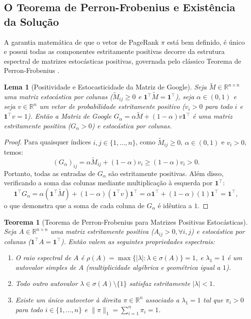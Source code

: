 \documentclass[10pt,a4paper]{article}
\theoremstyle{definition}
\theoremstyle{plain}
\newtheorem{teorema}[definicao]{Teorema}
\newtheorem{lema}[definicao]{Lema}
\theoremstyle{remark}
\begin{document}
\subsection{\sffamily O Teorema de Perron-Frobenius e Existência da Solução}

A garantia matemática de que o vetor de PageRank $\pi$ está bem definido, é único e possui todas as componentes estritamente positivas decorre da estrutura espectral de matrizes estocásticas positivas, governada pelo clássico Teorema de Perron-Frobenius \cite{strang2016, langville2006}.

\begin{lema}[Positividade e Estocasticidade da Matriz de Google]
\label{lema:positividade_google}
Seja $\widetilde{M} \in \mathbb{R}^{n \times n}$ uma matriz estocástica por colunas ($\widetilde{M}_{ij} \ge 0$ e $\mathbf{1}^{\top}\widetilde{M} = \mathbf{1}^{\top}$), seja $\alpha \in (0, 1)$ e seja $v \in \mathbb{R}^n$ um vetor de probabilidade estritamente positivo ($v_i > 0$ para todo $i$ e $\mathbf{1}^{\top}v = 1$). Então a Matriz de Google $G_{\alpha} = \alpha \widetilde{M} + (1 - \alpha) v \mathbf{1}^{\top}$ é uma matriz estritamente positiva ($G_{\alpha} > 0$) e estocástica por colunas.
\end{lema}

\begin{proof}
Para quaisquer índices $i, j \in \{1, \dots, n\}$, como $\widetilde{M}_{ij} \ge 0$, $\alpha \in (0, 1)$ e $v_i > 0$, temos:
\[
(G_{\alpha})_{ij} = \alpha \widetilde{M}_{ij} + (1 - \alpha) v_i \ge (1 - \alpha) v_i > 0.
\]
Portanto, todas as entradas de $G_{\alpha}$ são estritamente positivas. Além disso, verificando a soma das colunas mediante multiplicação à esquerda por $\mathbf{1}^{\top}$:
\[
\mathbf{1}^{\top} G_{\alpha} = \alpha (\mathbf{1}^{\top} \widetilde{M}) + (1 - \alpha) (\mathbf{1}^{\top} v) \mathbf{1}^{\top} = \alpha \mathbf{1}^{\top} + (1 - \alpha)(1) \mathbf{1}^{\top} = \mathbf{1}^{\top},
\]
o que demonstra que a soma de cada coluna de $G_{\alpha}$ é idêntica a $1$.
\end{proof}

\begin{teorema}[Teorema de Perron-Frobenius para Matrizes Positivas Estocásticas]
\label{teo:perron_frobenius}
Seja $A \in \mathbb{R}^{n \times n}$ uma matriz estritamente positiva ($A_{ij} > 0, \forall i, j$) e estocástica por colunas ($\mathbf{1}^{\top} A = \mathbf{1}^{\top}$). Então valem as seguintes propriedades espectrais:
\begin{enumerate}
    \item O raio espectral de $A$ é $\rho(A) = \max\{|\lambda| : \lambda \in \sigma(A)\} = 1$, e $\lambda_1 = 1$ é um autovalor simples de $A$ (multiplicidade algébrica e geométrica igual a $1$).
    \item Todo outro autovalor $\lambda \in \sigma(A) \setminus \{1\}$ satisfaz estritamente $|\lambda| < 1$.
    \item Existe um único autovetor à direita $\pi \in \mathbb{R}^n$ associado a $\lambda_1 = 1$ tal que $\pi_i > 0$ para todo $i \in \{1, \dots, n\}$ e $\|\pi\|_1 = \sum_{i=1}^{n} \pi_i = 1$.
\end{enumerate}
\end{teorema}
\end{document}
